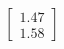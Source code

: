 \documentclass[preview]{standalone}
\begin{document}
\begin{align*}
\begin{bmatrix} 1.47 \\ 1.58 \end{bmatrix}
\end{align*}
\end{document}
